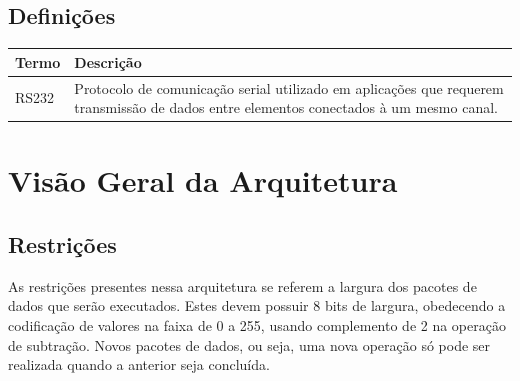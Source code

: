 \documentclass{report}
\begin{document}
  \section{Definições}
    \FloatBarrier
    \begin{table}[H]
      \begin{center}
        \begin{tabular}[pos]{|m{5cm} | m{9cm}|} 
          \hline
          \cellcolor[gray]{0.9}\textbf{Termo} & \cellcolor[gray]{0.9}\textbf{Descrição} \\ 
          \hline
          RS232                & Protocolo de comunicação serial utilizado em aplicações que requerem transmissão de dados entre elementos conectados à um mesmo canal.                    \\ 
          \hline
        \end{tabular}
      \end{center}
    \end{table}  


\chapter{Visão Geral da Arquitetura}

	\section{Restrições}
	As restrições presentes nessa arquitetura se referem a largura dos pacotes de dados que serão executados. Estes devem possuir 8 bits de largura, obedecendo a codificação de valores na faixa de 0 a 255, usando complemento de 2 na operação de subtração. 
	Novos pacotes de dados, ou seja, uma nova operação só pode ser realizada quando a anterior seja concluída. 
	
\end{document}
